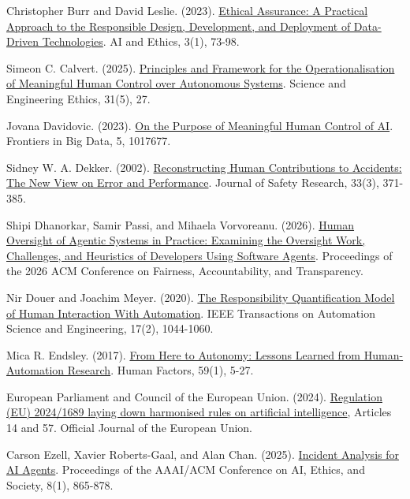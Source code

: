 \documentclass[11pt]{article}
\newenvironment{TAEReferences}{%
  \begin{list}{}{%
    \renewcommand{\makelabel}[1]{}%
    \setlength{\labelwidth}{0pt}%
    \setlength{\labelsep}{0pt}%
    \setlength{\leftmargin}{0.5in}%
    \setlength{\itemindent}{-0.5in}%
    \setlength{\itemsep}{0.45em}%
    \setlength{\parsep}{0pt}%
    \setlength{\topsep}{0.25em}%
  }%
}{\end{list}}
\begin{document}
\begin{TAEReferences}
\item{}\label{reference-7} Christopher Burr and David Leslie. (2023). \href{https://doi.org/10.1007/s43681-022-00178-0}{Ethical Assurance: A Practical Approach to the Responsible Design, Development, and Deployment of Data-Driven Technologies}. AI and Ethics, 3(1), 73-98.
\item{}\label{reference-8} Simeon C. Calvert. (2025). \href{https://doi.org/10.1007/s11948-025-00554-z}{Principles and Framework for the Operationalisation of Meaningful Human Control over Autonomous Systems}. Science and Engineering Ethics, 31(5), 27.
\item{}\label{reference-9} Jovana Davidovic. (2023). \href{https://doi.org/10.3389/fdata.2022.1017677}{On the Purpose of Meaningful Human Control of AI}. Frontiers in Big Data, 5, 1017677.
\item{}\label{reference-10} Sidney W. A. Dekker. (2002). \href{https://doi.org/10.1016/S0022-4375(02)00032-4}{Reconstructing Human Contributions to Accidents: The New View on Error and Performance}. Journal of Safety Research, 33(3), 371-385.
\item{}\label{reference-11} Shipi Dhanorkar, Samir Passi, and Mihaela Vorvoreanu. (2026). \href{https://doi.org/10.1145/3805689.3812402}{Human Oversight of Agentic Systems in Practice: Examining the Oversight Work, Challenges, and Heuristics of Developers Using Software Agents}. Proceedings of the 2026 ACM Conference on Fairness, Accountability, and Transparency.
\item{}\label{reference-12} Nir Douer and Joachim Meyer. (2020). \href{https://doi.org/10.1109/TASE.2020.2965466}{The Responsibility Quantification Model of Human Interaction With Automation}. IEEE Transactions on Automation Science and Engineering, 17(2), 1044-1060.
\item{}\label{reference-13} Mica R. Endsley. (2017). \href{https://doi.org/10.1177/0018720816681350}{From Here to Autonomy: Lessons Learned from Human-Automation Research}. Human Factors, 59(1), 5-27.
\item{}\label{reference-14} European Parliament and Council of the European Union. (2024). \href{https://eur-lex.europa.eu/eli/reg/2024/1689/oj}{Regulation (EU) 2024/1689 laying down harmonised rules on artificial intelligence}, Articles 14 and 57. Official Journal of the European Union.
\item{}\label{reference-15} Carson Ezell, Xavier Roberts-Gaal, and Alan Chan. (2025). \href{https://doi.org/10.1609/aies.v8i1.36596}{Incident Analysis for AI Agents}. Proceedings of the AAAI/ACM Conference on AI, Ethics, and Society, 8(1), 865-878.

\end{TAEReferences}
\end{document}
